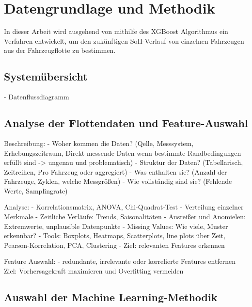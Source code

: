 
\chapter{Datengrundlage und Methodik}

In dieser Arbeit wird ausgehend von \cite{gradientBoostingRegressionTree} mithilfe des \ac{XGBoost} Algorithmus ein Verfahren entwickelt, um den zukünftigen \acs{SoH}-Verlauf von einzelnen Fahrzeugen aus der Fahrzeugflotte zu bestimmen.

\section{Systemübersicht}

- Datenflussdiagramm

\section{Analyse der Flottendaten und Feature-Auswahl}

Beschreibung:
- Woher kommen die Daten? (Qelle, Messsystem, Erhebungszeitraum, Direkt messende Daten wenn bestimmte Randbedingungen erfüllt sind -> ungenau und problematisch)
- Struktur der Daten? (Tabellarisch, Zeitreihen, Pro Fahrzeug oder aggregiert)
- Was enthalten sie? (Anzahl der Fahrzeuge, Zyklen, welche Messgrößen)
- Wie vollständig sind sie? (Fehlende Werte, Samplingrate)

Analyse:
- Korrelationsmatrix, ANOVA, Chi-Quadrat-Test
- Verteilung einzelner Merkmale
- Zeitliche Verläufe: Trends, Saisonalitäten
- Ausreißer und Anomielen: Extremwerte, unplausible Datenpunkte
- Missing Values: Wie viele, Muster erkennbar?
- Tools: Boxplots, Heatmaps, Scatterplots, line plots über Zeit, Pearson-Korrelation, PCA, Clustering
- Ziel: relevanten Features erkennen

Feature Auswahl:
- redundante, irrelevante oder korrelierte Features entfernen
Ziel: Vorhersagekraft maximieren und Overfitting vermeiden

\section{Auswahl der Machine Learning-Methodik}